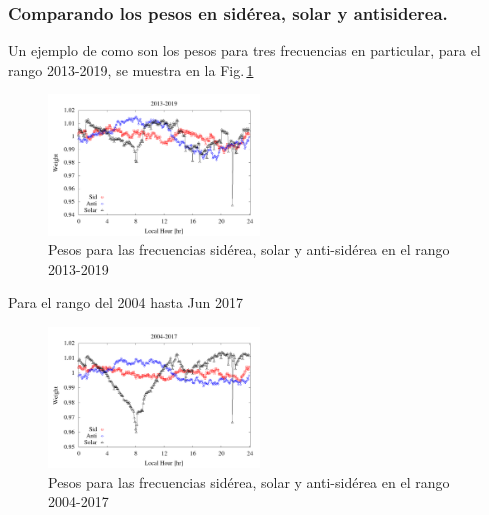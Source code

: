 
\subsubsection{Comparando los pesos en sidérea, solar y antisiderea.}

Un ejemplo de como son los pesos para tres frecuencias en particular, para el rango 2013-2019, se muestra en la Fig.\,\ref{fig:pesos}


\begin{figure}[H]
	\centering
	\includegraphics[width=0.5\textwidth]{weigth2013-2019.png}
	\caption{Pesos para las frecuencias sidérea, solar y anti-sidérea en el rango 2013-2019}
	\label{fig:pesos}
\end{figure}


Para el rango del 2004 hasta Jun 2017

\begin{figure}[H]
	\centering
	\includegraphics[width=0.5\textwidth]{weigth2004-2017.png}
	\caption{Pesos para las frecuencias sidérea, solar y anti-sidérea en el rango 2004-2017}
	\label{fig:pesos_2017}
\end{figure}



